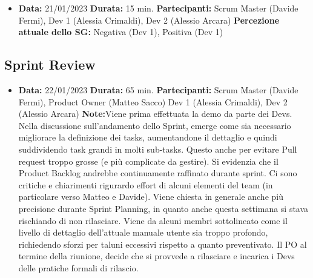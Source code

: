 \documentclass{article}
\begin{document}
    \begin{itemize}
        \item \textbf{Data:} 21/01/2023
        \newline \textbf{Durata:} 15 min.
        \newline \textbf{Partecipanti:} Scrum Master (Davide Fermi), Dev 1 (Alessia Crimaldi), Dev 2 (Alessio Arcara)
        \newline \textbf{Percezione attuale dello SG:} Negativa (Dev 1), Positiva (Dev 1)
    \end{itemize}

    \subsection{Sprint Review}
    \begin{itemize}
        \item \textbf{Data:} 22/01/2023
        \newline \textbf{Durata:} 65 min.
        \newline \textbf{Partecipanti:} Scrum Master (Davide Fermi), Product Owner (Matteo Sacco) Dev 1 (Alessia Crimaldi), Dev 2 (Alessio Arcara)
        \newline \textbf{Note:}Viene prima effettuata la demo da parte dei Devs. Nella discussione sull'andamento dello Sprint, emerge come sia necessario migliorare la definizione dei tasks, aumentandone il dettaglio e quindi suddividendo task grandi in molti sub-tasks. Questo anche per evitare Pull request troppo grosse (e più complicate da gestire). Si evidenzia che il Product Backlog andrebbe continuamente raffinato durante sprint. Ci sono critiche e chiarimenti rigurardo effort di alcuni elementi del team (in particolare verso Matteo e Davide). Viene chiesta in generale anche più precisione durante Sprint Planning, in quanto anche questa settimana si stava rischiando di non rilasciare. Viene da alcuni membri sottolineato come il livello di dettaglio dell'attuale manuale utente sia troppo profondo, richiedendo sforzi per taluni eccessivi rispetto a quanto preventivato. Il PO al termine della riunione, decide che si provvede a rilasciare e incarica i Devs delle pratiche formali di rilascio.
    \end{itemize}
\end{document}
